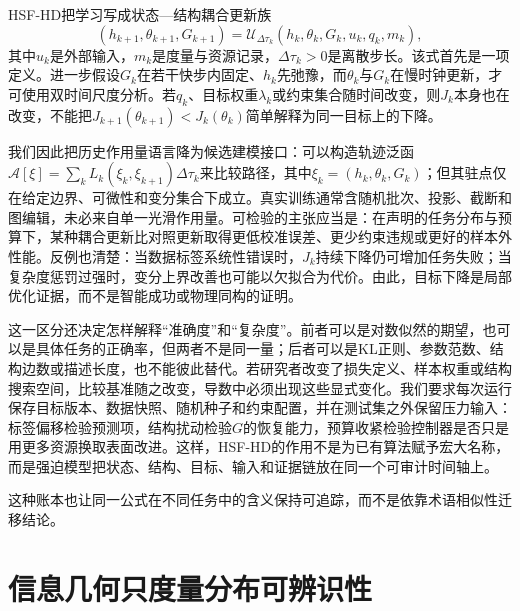 HSF-HD把学习写成状态—结构耦合更新族
\begin{equation}
(h_{k+1},\theta_{k+1},G_{k+1})=\mathcal U_{\Delta\tau_k}
\left(h_k,\theta_k,G_k,u_k,q_k,m_k\right),
\end{equation}
其中$u_k$是外部输入，$m_k$是度量与资源记录，$\Delta\tau_k>0$是离散步长。该式首先是一项定义。进一步假设$G_k$在若干快步内固定、$h_k$先弛豫，而$\theta_k$与$G_k$在慢时钟更新，才可使用双时间尺度分析。若$q_k$、目标权重$\lambda_k$或约束集合随时间改变，则$J_k$本身也在改变，不能把$J_{k+1}(\theta_{k+1})<J_k(\theta_k)$简单解释为同一目标上的下降。

我们因此把历史作用量语言降为候选建模接口：可以构造轨迹泛函$\mathcal A[\xi]=\sum_k L_k(\xi_k,\xi_{k+1})\Delta\tau_k$来比较路径，其中$\xi_k=(h_k,\theta_k,G_k)$；但其驻点仅在给定边界、可微性和变分集合下成立。真实训练通常含随机批次、投影、截断和图编辑，未必来自单一光滑作用量。可检验的主张应当是：在声明的任务分布与预算下，某种耦合更新比对照更新取得更低校准误差、更少约束违规或更好的样本外性能。反例也清楚：当数据标签系统性错误时，$J_k$持续下降仍可增加任务失败；当复杂度惩罚过强时，变分上界改善也可能以欠拟合为代价。由此，目标下降是局部优化证据，而不是智能成功或物理同构的证明。

这一区分还决定怎样解释“准确度”和“复杂度”。前者可以是对数似然的期望，也可以是具体任务的正确率，但两者不是同一量；后者可以是KL正则、参数范数、结构边数或描述长度，也不能彼此替代。若研究者改变了损失定义、样本权重或结构搜索空间，比较基准随之改变，导数中必须出现这些显式变化。我们要求每次运行保存目标版本、数据快照、随机种子和约束配置，并在测试集之外保留压力输入：标签偏移检验预测项，结构扰动检验$G$的恢复能力，预算收紧检验控制器是否只是用更多资源换取表面改进。这样，HSF-HD的作用不是为已有算法赋予宏大名称，而是强迫模型把状态、结构、目标、输入和证据链放在同一个可审计时间轴上。

这种账本也让同一公式在不同任务中的含义保持可追踪，而不是依靠术语相似性迁移结论。

\section{信息几何只度量分布可辨识性}
\label{sec:cognitive_einstein_information_geometry}


